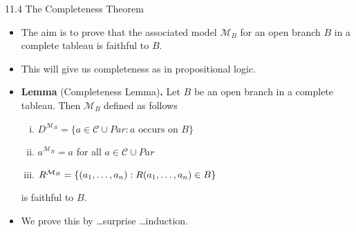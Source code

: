 \documentclass[../slides.tex]{subfiles}
\begin{document}
\begin{frame}{11.4 The Completeness Theorem}

  \begin{itemize}

    \item The aim is to prove that the associated model
      $\mathcal{M}_B$ for an open branch $B$ in a complete tableau is
      faithful to $B$.

    \item This will give us completeness as in propositional logic.

      \item \textbf{Lemma} (Completeness Lemma)\textbf{.} Let $B$ be an open
      branch in a complete tableau. Then $\mathcal{M}_B$ defined as follows
		\begin{enumerate}[(i)]
		
			\item $D^{\mathcal{M}_B}=\{a\in \mathcal{C}\cup Par: a\text{ occurs on }B\}$
			
			\item $a^{\mathcal{M}_B}=a$ for all $a\in \mathcal{C}\cup Par$
			
			\item $R^{\mathcal{M}_B}=\{(a_1, \mathellipsis, a_n): R(a_1, \mathellipsis, a_n)\in B\}$
		
		\end{enumerate}
                is faithful to $B$.

                \item We prove this by \dots surprise \dots induction.
                
  \end{itemize}
  
\end{frame}
\end{document}
